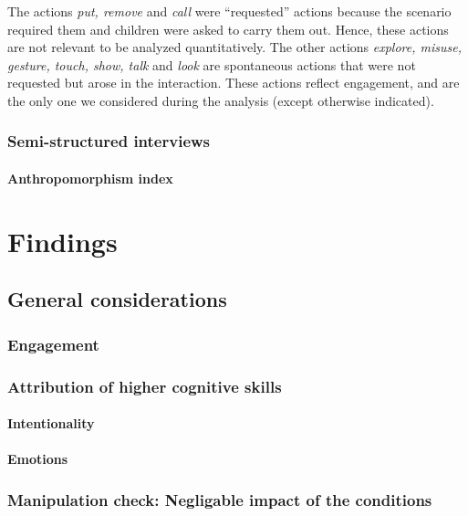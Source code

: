 \documentclass{sig-alternate}
\begin{document}
The actions \textit{put, remove} and \textit{call} were ``requested'' actions
because the scenario required them and children were asked to carry them out.
Hence, these actions are not relevant to be analyzed quantitatively. The other
actions \textit{explore, misuse, gesture, touch, show, talk} and \textit{look}
are spontaneous actions that were not requested but arose in the interaction.
These actions reflect engagement, and are the only one we considered during the
analysis (except otherwise indicated).

\subsubsection{Semi-structured interviews}

\paragraph{Anthropomorphism index}


\section{Findings}

\subsection{General considerations}

\subsubsection{Engagement}

\subsubsection{Attribution of higher cognitive skills}
\paragraph{Intentionality}
\paragraph{Emotions}

\subsubsection{Manipulation check: Negligable impact of the conditions}
\end{document}
